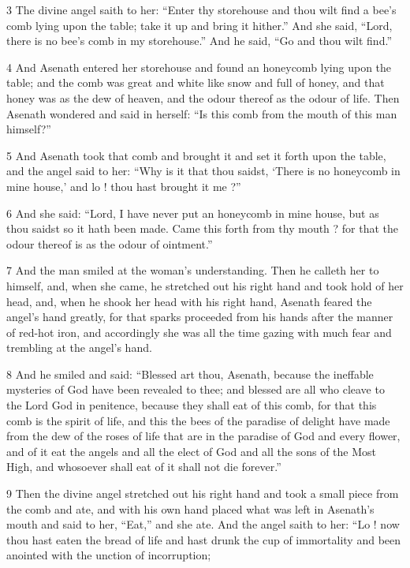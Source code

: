 \par 3 The divine angel saith to her: “Enter thy storehouse and thou wilt find a bee's comb lying upon the table; take it up and bring it hither.” And she said, “Lord, there is no bee's comb in my storehouse.” And he said, “Go and thou wilt find.” 

\par 4 And Asenath entered her storehouse and found an honeycomb lying upon the table; and the comb was great and white like snow and full of honey, and that honey was as the dew of heaven, and the odour thereof as the odour of life. Then Asenath wondered and said in herself: “Is this comb from the mouth of this man himself?” 

\par 5 And Asenath took that comb and brought it and set it forth upon the table, and the angel said to her: “Why is it that thou saidst, ‘There is no honeycomb in mine house,’ and lo ! thou hast brought it me ?” 

\par 6 And she said: “Lord, I have never put an honeycomb in mine house, but as thou saidst so it hath been made. Came this forth from thy mouth ? for that the odour thereof is as the odour of ointment.” 

\par 7 And the man smiled at the woman's understanding. Then he calleth her to himself, and, when she came, he stretched out his right hand and took hold of her head, and, when he shook her head with his right hand, Asenath feared the angel's hand greatly, for that sparks proceeded from his hands after the manner of red-hot iron, and accordingly she was all the time gazing with much fear and trembling at the angel's hand. 

\par 8 And he smiled and said: “Blessed art thou, Asenath, because the ineffable mysteries of God have been revealed to thee; and blessed are all who cleave to the Lord God in penitence, because they shall eat of this comb, for that this comb is the spirit of life, and this the bees of the paradise of delight have made from the dew of the roses of life that are in the paradise of God and every flower, and of it eat the angels and all the elect of God and all the sons of the Most High, and whosoever shall eat of it shall not die forever.” 

\par 9 Then the divine angel stretched out his right hand and took a small piece from the comb and ate, and with his own hand placed what was left in Asenath's mouth and said to her, “Eat,” and she ate. And the angel saith to her: “Lo ! now thou hast eaten the bread of life and hast drunk the cup of immortality and been anointed with the unction of incorruption; 

